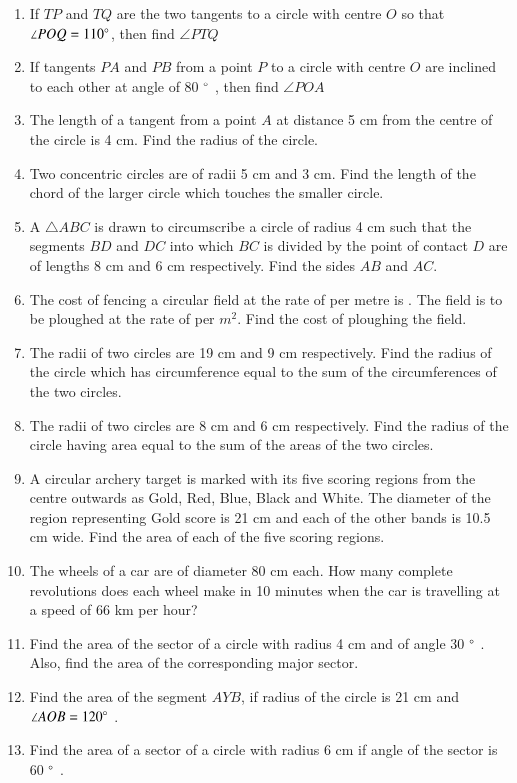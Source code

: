 \begin{enumerate}[label=\thesection.\arabic*.,ref=\thesection.\theenumi]
\item  If $TP$ and $TQ$ are the two tangents to a circle with centre $O$ so that  $\angle  POQ = 110 \degree $, then find  $\angle  PTQ$
\item  If tangents $PA$ and $PB$ from a point $P$ to a circle with centre $O$ are inclined to each other at angle of 80 $\degree$ , then find  $\angle  POA $
%
\item The length of a tangent from a point $A$ at distance 5 cm from the centre of the circle is 4 cm. Find the radius of the circle.
\item  Two concentric circles are of radii 5 cm and 3 cm. Find the length of the chord of the larger circle which touches the smaller circle.
%
\item A $\triangle ABC$ is drawn to circumscribe a circle of radius 4 cm such that the segments $BD$ and $DC$ into which $BC$ is divided by the point of contact $D$ are of lengths 8 cm and 6 cm respectively. Find the sides $AB$ and $AC$.
%
\item The cost of fencing a circular field at the rate of  per metre is . The field is to be ploughed at the rate of  per $m^2$.  Find the cost of ploughing the field.	
\item The radii of two circles are 19 cm and 9 cm respectively. Find the radius of the circle which has circumference equal to the sum of the circumferences of the two circles.
\item The radii of two circles are 8 cm and 6 cm respectively. Find the radius of the circle having area equal to the sum of the areas of the two circles.
\item A circular  archery target is marked with its five scoring regions from the centre outwards as Gold, Red, Blue, Black and White. The diameter of the region representing Gold score is 21 cm and each of the other bands is 10.5 cm wide. Find the area of each of the five scoring regions.
\item The wheels of a car are of diameter 80 cm each. How many complete revolutions does each wheel make in 10 minutes when the car is travelling at a speed of 66 km per hour?
%
 \item Find the area of the sector of a circle with radius 4 cm and of angle 30 $\degree$ . Also, find the area of the corresponding major sector.
\item Find the area of the segment $AYB$, if radius of the circle is 21 cm and
 $\angle  AOB = 120 \degree$ .
%
\item Find the area of a sector of a circle with radius 6 cm if angle of the sector is 60 $\degree$ . 

\end{enumerate}
